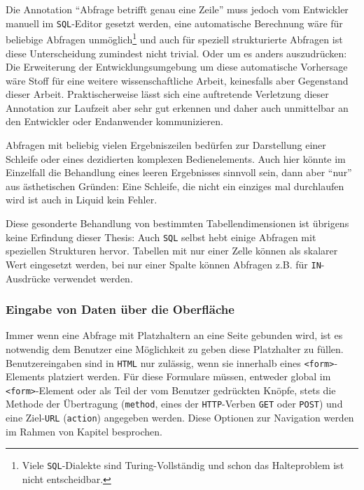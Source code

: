 Die Annotation "`Abfrage betrifft genau eine Zeile"' muss jedoch vom Entwickler manuell im \texttt{SQL}-Editor gesetzt werden, eine automatische Berechnung wäre für beliebige Abfragen unmöglich\footnote{Viele \texttt{SQL}-Dialekte sind Turing-Vollständig und schon das Halteproblem ist nicht entscheidbar.} und auch für speziell strukturierte Abfragen ist diese Unterscheidung zumindest nicht trivial. Oder um es anders auszudrücken: Die Erweiterung der Entwicklungsumgebung um diese automatische Vorhersage wäre Stoff für eine weitere wissenschaftliche Arbeit, keinesfalls aber Gegenstand dieser Arbeit. Praktischerweise lässt sich eine auftretende Verletzung dieser Annotation zur Laufzeit aber sehr gut erkennen und daher auch unmittelbar an den Entwickler oder Endanwender kommunizieren. 

Abfragen mit beliebig vielen Ergebniszeilen bedürfen zur Darstellung einer Schleife oder eines dezidierten komplexen Bedienelements. Auch hier könnte im Einzelfall die Behandlung eines leeren Ergebnisses sinnvoll sein, dann aber "`nur"' aus ästhetischen Gründen: Eine Schleife, die nicht ein einziges mal durchlaufen wird ist auch in Liquid kein Fehler.

Diese gesonderte Behandlung von bestimmten Tabellendimensionen ist übrigens keine Erfindung dieser Thesis: Auch \texttt{SQL} selbst hebt einige Abfragen mit speziellen Strukturen hervor. Tabellen mit nur einer Zelle können als skalarer Wert eingesetzt werden, bei nur einer Spalte können Abfragen z.B. für \texttt{IN}-Ausdrücke verwendet werden.

\subsubsection{Eingabe von Daten über die Oberfläche}
\label{sec:design-ui-bind-input}

Immer wenn eine Abfrage mit Platzhaltern an eine Seite gebunden wird, ist es notwendig dem Benutzer eine Möglichkeit zu geben diese Platzhalter zu füllen. Benutzereingaben sind in \texttt{HTML} nur zulässig, wenn sie innerhalb  eines \texttt{<form>}-Elements platziert werden. Für diese Formulare müssen, entweder global im \texttt{<form>}-Element oder als Teil der vom Benutzer gedrückten Knöpfe, stets die Methode der Übertragung (\texttt{method}, eines der \texttt{HTTP}-Verben \texttt{GET} oder \texttt{POST}) und eine Ziel-\texttt{URL} (\texttt{action}) angegeben werden. Diese Optionen zur Navigation werden im Rahmen von Kapitel  besprochen.

